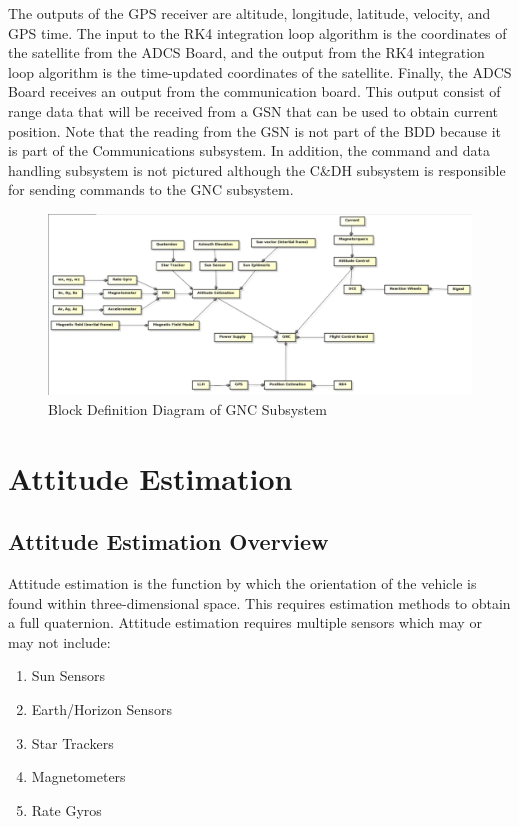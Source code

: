 \documentclass[conf]{new-aiaa}
\begin{document}
The outputs of the GPS receiver are altitude, longitude, latitude, velocity, and GPS time. The input to the RK4 integration loop algorithm is the coordinates of the satellite from the ADCS Board, and the output from the RK4 integration loop algorithm is the time-updated coordinates of the satellite. Finally, the ADCS Board receives an output from the communication board. This output consist of range data that will be received from a GSN that can be used to obtain current position. Note that the reading from the GSN is not part of the BDD because it is part of the Communications subsystem. In addition, the command and data handling subsystem is not pictured although the C&DH subsystem is responsible for sending commands to the GNC subsystem.

\begin{figure}[H]
\centering
\includegraphics[width=1.0\textwidth]{Figures/BDD_GNC.png}
\caption{Block Definition Diagram of GNC Subsystem}
\label{fig:BDD}
\end{figure}





\section{Attitude Estimation}
\subsection{Attitude Estimation Overview}
Attitude estimation is the function by which the orientation of the vehicle is found within three-dimensional space. This requires estimation methods to obtain a full quaternion. Attitude estimation requires multiple sensors which may or may not include: 

\begin{enumerate}
\item Sun Sensors
\item Earth/Horizon Sensors
\item Star Trackers
\item Magnetometers
\item Rate Gyros
\end{enumerate}
\end{document}
